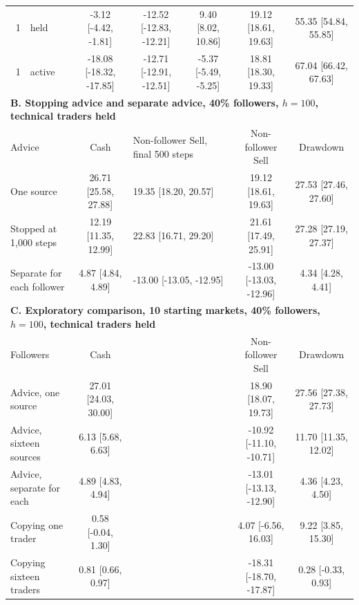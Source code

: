 \begin{center}
\begin{minipage}{\linewidth}
\begin{tabular}{rlccccc}
1 & held & -3.12 [-4.42, -1.81] & -12.52 [-12.83, -12.21] & 9.40 [8.02, 10.86] & 19.12 [18.61, 19.63] & 55.35 [54.84, 55.85] \\
1 & active & -18.08 [-18.32, -17.85] & -12.71 [-12.91, -12.51] & -5.37 [-5.49, -5.25] & 18.81 [18.30, 19.33] & 67.04 [66.42, 67.63] \\
\midrule
\multicolumn{7}{l}{\textbf{B. Stopping advice and separate advice, 40\% followers, $h=100$, technical traders held}} \\
\multicolumn{2}{l}{Advice} & Cash & \multicolumn{2}{l}{Non-follower Sell, final 500 steps} & Non-follower Sell & Drawdown \\
\midrule
\multicolumn{2}{l}{One source} & 26.71 [25.58, 27.88] & \multicolumn{2}{l}{19.35 [18.20, 20.57]} & 19.12 [18.61, 19.63] & 27.53 [27.46, 27.60] \\
\multicolumn{2}{l}{Stopped at 1,000 steps} & 12.19 [11.35, 12.99] & \multicolumn{2}{l}{22.83 [16.71, 29.20]} & 21.61 [17.49, 25.91] & 27.28 [27.19, 27.37] \\
\multicolumn{2}{l}{Separate for each follower} & 4.87 [4.84, 4.89] & \multicolumn{2}{l}{-13.00 [-13.05, -12.95]} & -13.00 [-13.03, -12.96] & 4.34 [4.28, 4.41] \\
\midrule
\multicolumn{7}{l}{\textbf{C. Exploratory comparison, 10 starting markets, 40\% followers, $h=100$, technical traders held}} \\
\multicolumn{2}{l}{Followers} & Cash & \multicolumn{2}{l}{} & Non-follower Sell & Drawdown \\
\midrule
\multicolumn{2}{l}{Advice, one source} & 27.01 [24.03, 30.00] & \multicolumn{2}{l}{} & 18.90 [18.07, 19.73] & 27.56 [27.38, 27.73] \\
\multicolumn{2}{l}{Advice, sixteen sources} & 6.13 [5.68, 6.63] & \multicolumn{2}{l}{} & -10.92 [-11.10, -10.71] & 11.70 [11.35, 12.02] \\
\multicolumn{2}{l}{Advice, separate for each} & 4.89 [4.83, 4.94] & \multicolumn{2}{l}{} & -13.01 [-13.13, -12.90] & 4.36 [4.23, 4.50] \\
\multicolumn{2}{l}{Copying one trader} & 0.58 [-0.04, 1.30] & \multicolumn{2}{l}{} & 4.07 [-6.56, 16.03] & 9.22 [3.85, 15.30] \\
\multicolumn{2}{l}{Copying sixteen traders} & 0.81 [0.66, 0.97] & \multicolumn{2}{l}{} & -18.31 [-18.70, -17.87] & 0.28 [-0.33, 0.93] \\
\bottomrule
\end{tabular}
\end{minipage}
\end{center}
